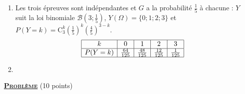 \begin{description}
\begin{enumerate}
            \begin{enumerate}
               \item {}
                  Les trois \'epreuves sont ind\'ependantes et $G$ a la probabilit\'e $\frac{1}{5}$ \`a chacune :
                  $Y$ suit la loi binomiale $\mathscr{B}\left(3 ; \frac{1}{5}\right)$, $Y(\Omega) = \{0 ; 1 ; 2 ; 3\}$ et
                  $P(Y = k) = \mathrm{C}_3^k \left(\frac{1}{5}\right)^k\left(\frac{4}{5}\right)^{3-k}$.
                  \[
                     \begin{array}{|c|c|c|c|c|}
                        \hline
                        k & 0 & 1 & 2 & 3 \\ \hline
                        P(Y = k) & \frac{64}{125} & \frac{48}{125} & \frac{12}{125} & \frac{1}{125} \\ \hline
                     \end{array}
                  \]
               \item {}
                  \par\noindent{}
            \end{enumerate}
      \end{enumerate}
\end{description}
\noindent \underline{\textsc{\textbf{Probl\`eme}}} (10 points)
